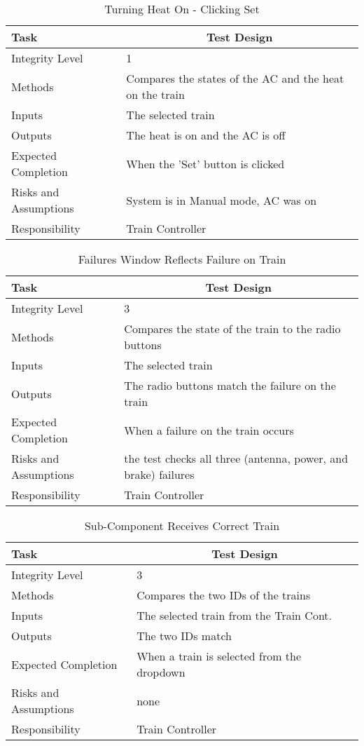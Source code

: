 \documentclass[]{article}
\begin{document}
\begin{table}[H]
	\centering
	\caption{Turning Heat On - Clicking Set}
	\begin{tabular}{|l|l|}
		\hline
		Task & \multicolumn{1}{c|}{Test Design} \\ \hline
		Integrity Level & 1 \\ \hline
		Methods & Compares the states of the AC and the heat on the train\\ \hline
		Inputs & The selected train\\ \hline
		Outputs & The heat is on and the AC is off \\ \hline
		Expected Completion & When the 'Set' button is clicked\\ \hline
		Risks and Assumptions & System is in Manual mode, AC was on \\ \hline
		Responsibility &  Train Controller\\ \hline
	\end{tabular}
\end{table}

\begin{table}[H]
	\centering
	\caption{Failures Window Reflects Failure on Train}
	\begin{tabular}{|l|l|}
		\hline
		Task & \multicolumn{1}{c|}{Test Design} \\ \hline
		Integrity Level & 3 \\ \hline
		Methods & Compares the state of the train to the radio buttons\\ \hline
		Inputs & The selected train\\ \hline
		Outputs & The radio buttons match the failure on the train\\ \hline
		Expected Completion & When a failure on the train occurs\\ \hline
		Risks and Assumptions & the test checks all three (antenna, power, and brake) failures \\ \hline
		Responsibility & Train Controller\\ \hline
	\end{tabular}
\end{table}

\begin{table}[H]
	\centering
	\caption{Sub-Component Receives Correct Train}
	\begin{tabular}{|l|l|}
		\hline
		Task & \multicolumn{1}{c|}{Test Design} \\ \hline
		Integrity Level & 3 \\ \hline
		Methods & Compares the two IDs of the trains\\ \hline
		Inputs & The selected train from the Train Cont.\\ \hline
		Outputs & The two IDs match \\ \hline
		Expected Completion & When a train is selected from the dropdown\\ \hline
		Risks and Assumptions & none \\ \hline
		Responsibility & Train Controller\\ \hline
	\end{tabular}
\end{table}
\end{document}
